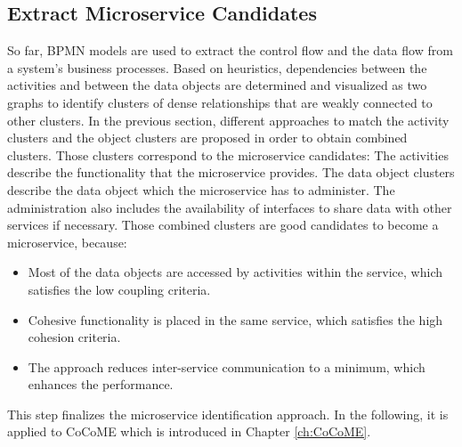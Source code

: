 \subsection{Extract Microservice Candidates}
\label{sec:Solution:ExtractMicroserviceCandidates}
So far, BPMN models are used to extract the control flow and the data flow from a system's business processes. Based on heuristics, dependencies between the activities and between the data objects are determined and visualized as two graphs to identify clusters of dense relationships that are weakly connected to other clusters. In the previous section, different approaches to match the activity clusters and the object clusters are proposed in order to obtain combined clusters. Those clusters correspond to the microservice candidates: The activities describe the functionality that the microservice provides. The data object clusters describe the data object which the microservice has to administer. The administration also includes the availability of interfaces to share data with other services if necessary.
Those combined clusters are good candidates to become a microservice, because:
\begin{itemize}
	\item Most of the data objects are accessed by activities within the service, which satisfies the low coupling criteria.
	\item Cohesive functionality is placed in the same service, which satisfies the high cohesion criteria.
	\item The approach reduces inter-service communication to a minimum, which enhances the performance.
\end{itemize}

\noindent
This step finalizes the microservice identification approach. In the following, it is applied to CoCoME which is introduced in Chapter \ref{ch:CoCoME}. 










